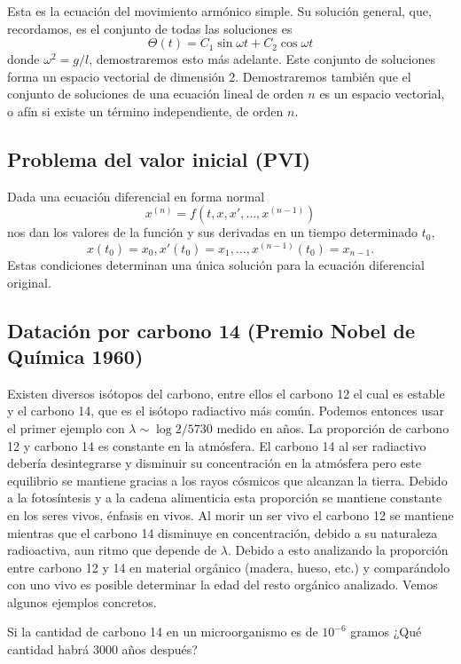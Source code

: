 \documentclass[../main.tex]{subfiles}
\begin{document}
Esta es la ecuación del movimiento armónico simple. Su solución general, que, 
recordamos, es el conjunto de todas las soluciones es
\[\Theta(t) = C_1 \sin \omega t + C_2 \cos \omega t\]
donde \(\omega^2 = g/l\), demostraremos esto más adelante. Este conjunto de
soluciones forma un espacio vectorial de dimensión 2. Demostraremos también que
el conjunto de soluciones de una ecuación lineal de orden \(n\) es un espacio
vectorial, o afín si existe un término independiente, de orden \(n\).

\subsection{Problema del valor inicial (PVI)}

Dada una ecuación diferencial en forma normal
\[x^{(n)} = f(t, x, x', \dots, x^{(n - 1)})\]
nos dan los valores de la función y sus derivadas en un tiempo determinado
\(t_0\),
\[x(t_0) = x_0, x'(t_0) = x_1, \dots, x^{(n - 1)}(t_0) = x_{n - 1}.\]
Estas condiciones determinan una única solución para la ecuación diferencial
original.

\subsection{Datación por carbono 14 (Premio Nobel de Química 1960)}

Existen diversos isótopos del carbono, entre ellos el carbono 12 el cual es
estable y el carbono 14, que es el isótopo radiactivo más común. Podemos
entonces usar el primer ejemplo con \(\lambda \sim \log 2 / 5730\) medido en
años. La proporción de carbono 12 y carbono 14 es constante en la atmósfera. El
carbono 14 al ser radiactivo debería desintegrarse y disminuir su concentración
en la atmósfera pero este equilibrio se mantiene gracias a los rayos cósmicos
que alcanzan la tierra. Debido a la fotosíntesis y a la cadena alimenticia esta
proporción se mantiene constante en los seres vivos, énfasis en vivos. Al morir
un ser vivo el carbono 12 se mantiene mientras que el carbono 14 disminuye en
concentración, debido a su naturaleza radioactiva, aun ritmo que depende de
\(\lambda\). Debido a esto analizando la proporción entre carbono 12 y 14 en
material orgánico (madera, hueso, etc.) y comparándolo con uno vivo es posible
determinar la edad del resto orgánico analizado. Vemos algunos ejemplos
concretos.

\begin{example}
	Si la cantidad de carbono 14 en un microorganismo es de \(10^{-6}\) gramos 
	¿Qué cantidad habrá 3000 años después? 
\end{example}
\end{document}

